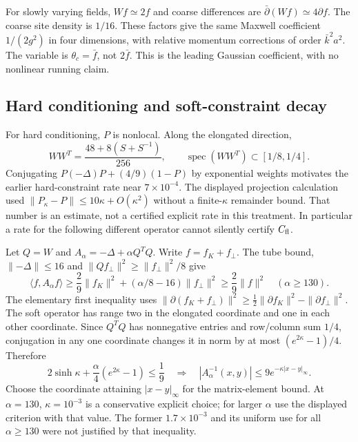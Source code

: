 \documentclass[11pt,a4paper]{article}
\begin{document}
For slowly varying fields, \(Wf\simeq2f\) and coarse differences are
\(\bar\partial(Wf)\simeq4\partial f\). The coarse site density is
\(1/16\). These factors give the same Maxwell coefficient \(1/(2g^2)\)
in four dimensions, with relative momentum corrections of order
\(\bar k^2a^2\). The variable is \(\theta_c=\bar f\), not \(2\bar f\).
This is the leading Gaussian coefficient, with no nonlinear running
claim.

\hypertarget{hard-conditioning-and-soft-constraint-decay}{%
\subsection{Hard conditioning and soft-constraint
decay}\label{hard-conditioning-and-soft-constraint-decay}}

For hard conditioning, \(P\) is nonlocal. Along the elongated direction,
\[WW^T=\frac{48+8(S+S^{-1})}{256},\qquad
 \operatorname{spec}(WW^T)\subset[1/8,1/4].\] Conjugating
\(P(-\Delta)P+(4/9)(1-P)\) by exponential weights motivates the earlier
hard-constraint rate near \(7\times10^{-4}\). The displayed projection
calculation used \(\|P_\kappa-P\|\le10\kappa+O(\kappa^2)\) without a
finite-\(\kappa\) remainder bound. That number is an estimate, not a
certified explicit rate in this treatment. In particular a rate for the
following different operator cannot silently certify \(C_{\rm fl}\).

Let \(Q=W\) and \(A_\alpha=-\Delta+\alpha Q^TQ\). Write
\(f=f_K+f_\perp\). The tube bound, \(\|{-\Delta}\|\le16\) and
\(\|Qf_\perp\|^2\ge\|f_\perp\|^2/8\) give
\[\langle f,A_\alpha f\rangle\ge
 \frac29\|f_K\|^2+(\alpha/8-16)\|f_\perp\|^2
 \ge\frac29\|f\|^2\quad(\alpha\ge130).\] The elementary first inequality
uses
\(\|\partial(f_K+f_\perp)\|^2\ge\frac12\|\partial f_K\|^2 -\|\partial f_\perp\|^2\).
The soft operator has range two in the elongated coordinate and one in
each other coordinate. Since \(Q^TQ\) has nonnegative entries and
row/column sum \(1/4\), conjugation in any one coordinate changes it in
norm by at most \((e^{2\kappa}-1)/4\). Therefore
\[2\sinh\kappa+\frac\alpha4(e^{2\kappa}-1)\le\frac19
 \quad\Longrightarrow\quad
 |A_\alpha^{-1}(x,y)|\le9e^{-\kappa|x-y|_\infty}.\] Choose the
coordinate attaining \(|x-y|_\infty\) for the matrix-element bound. At
\textbf{\(\alpha=130\)}, \(\kappa=10^{-3}\) is a conservative explicit
choice; for larger \(\alpha\) use the displayed criterion with that
value. The former \(1.7\times10^{-3}\) and its uniform use for all
\(\alpha\ge130\) were not justified by that inequality.
\end{document}
